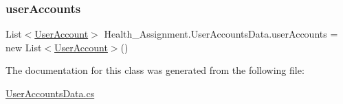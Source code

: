 \subsubsection{\texorpdfstring{user\+Accounts}{userAccounts}}
{\footnotesize\ttfamily List$<$\hyperlink{class_health___assignment_1_1_user_account}{User\+Account}$>$ Health\+\_\+\+Assignment.\+User\+Accounts\+Data.\+user\+Accounts = new List$<$\hyperlink{class_health___assignment_1_1_user_account}{User\+Account}$>$()\hspace{0.3cm}{\ttfamily [static]}}



The documentation for this class was generated from the following file\+:\begin{DoxyCompactItemize}
\item 
\hyperlink{_user_accounts_data_8cs}{User\+Accounts\+Data.\+cs}\end{DoxyCompactItemize}
